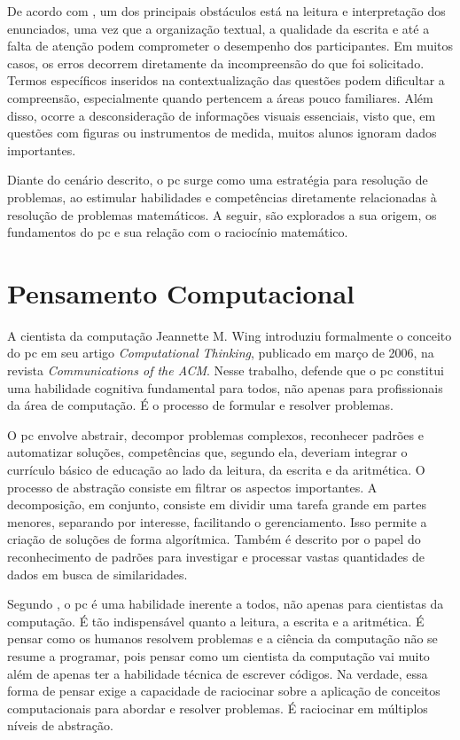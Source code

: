 De acordo com \cite{piton2018analise}, um dos principais obstáculos está na
leitura e interpretação dos enunciados, uma vez que a organização textual, a
qualidade da escrita e até a falta de atenção podem comprometer o desempenho dos
participantes. Em muitos casos, os erros decorrem diretamente da incompreensão
do que foi solicitado. Termos específicos inseridos na contextualização das
questões podem dificultar a compreensão, especialmente quando pertencem a áreas
pouco familiares. Além disso, ocorre a desconsideração de informações visuais
essenciais, visto que, em questões com figuras ou instrumentos de medida, muitos
alunos ignoram dados importantes.


Diante do cenário descrito, o \gls{pc} surge como uma
estratégia para resolução de problemas, ao estimular habilidades e competências
diretamente relacionadas à resolução de problemas matemáticos. A seguir, são
explorados a sua origem, os fundamentos do \gls{pc} e sua relação com o raciocínio
matemático.


\section{Pensamento Computacional}


A cientista da computação Jeannette M. Wing introduziu formalmente o conceito
do \gls{pc} em seu artigo \textit{Computational Thinking},
publicado em março de 2006, na revista \textit{Communications of the ACM}. Nesse
trabalho, \cite{wing2006} defende que o \gls{pc} constitui uma habilidade cognitiva
fundamental para todos, não apenas para profissionais da área de computação. É o
processo de formular e resolver problemas.


O \gls{pc} envolve abstrair, decompor problemas complexos, reconhecer padrões e
automatizar soluções, competências que, segundo ela, deveriam integrar o
currículo básico de educação ao lado da leitura, da escrita e da aritmética. O
processo de abstração consiste em filtrar os aspectos importantes. A
decomposição, em conjunto, consiste em dividir uma tarefa grande em partes
menores, separando por interesse, facilitando o gerenciamento. Isso permite
a criação de soluções de forma algorítmica. Também é descrito por
\cite{wing2006} o papel do reconhecimento de padrões para investigar e processar
vastas quantidades de dados em busca de similaridades.


\newpage{}


Segundo \cite{wing2006}, o \gls{pc} é uma habilidade inerente a todos, não apenas para
cientistas da computação. É tão indispensável quanto a leitura, a escrita e a
aritmética. É pensar como os humanos resolvem problemas e a ciência da
computação não se resume a programar, pois pensar como um cientista da
computação vai muito além de apenas ter a habilidade técnica de escrever
códigos. Na verdade, essa forma de pensar exige a capacidade de raciocinar sobre
a aplicação de conceitos computacionais para abordar e resolver problemas. É
raciocinar em múltiplos níveis de abstração.


